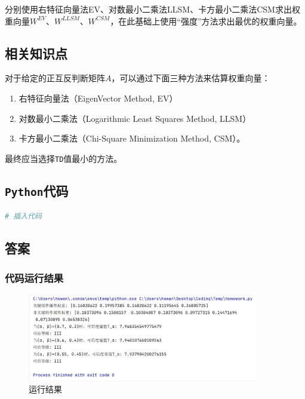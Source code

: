 \documentclass{article}
\begin{document}
分别使用右特征向量法EV、对数最小二乘法LLSM、卡方最小二乘法CSM求出权重向量$W^{EV}$、$W^{LLSM}$、$W^{CSM}$，在此基础上使用“强度”方法求出最优的权重向量。

\subsection{相关知识点}

对于给定的正互反判断矩阵$A$，可以通过下面三种方法来估算权重向量：

\begin{enumerate}
	\item 右特征向量法（EigenVector Method, EV）
	\item 对数最小二乘法（Logarithmic Least Squares Method, LLSM）
	\item 卡方最小二乘法（Chi-Square Minimization Method, CSM）。
\end{enumerate}

最终应当选择\texttt{TD}值最小的方法。

\subsection{\texttt{Python}代码}

\begin{lstlisting}[language=Python]
	# 插入代码
\end{lstlisting}

\subsection{答案}

\subsubsection{代码运行结果}

\begin{figure}[H]
	\centering
	\includegraphics[width=0.9\textwidth]{img/1.png}
	\caption{运行结果}
\end{figure}
\end{document}
